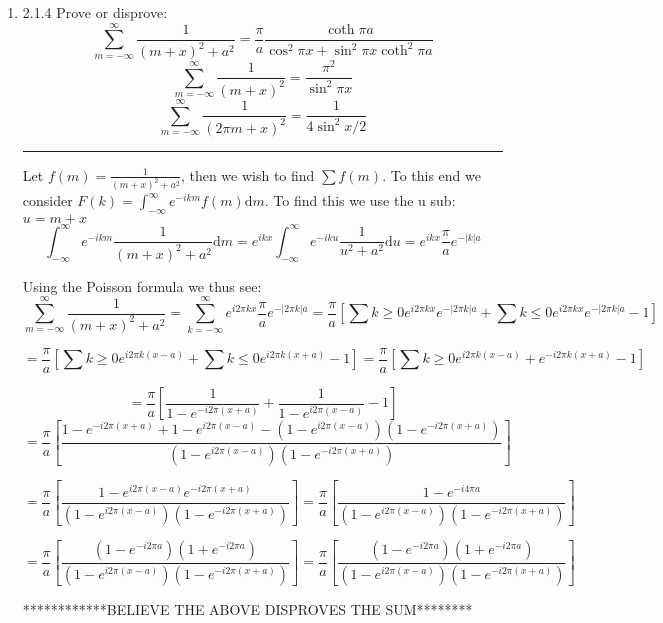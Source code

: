 \documentclass[12pt]{article}
\newcommand{\di}{\mathrm{d}}
\newcommand{\intinf}{\int_{-\infty}^\infty}
\newcommand{\suminf}[1]{\sum_{#1 = -\infty}^\infty}
\theoremstyle{definition}
\begin{document}
\begin{enumerate}
\item 2.1.4
Prove or disprove:
\[
\suminf{m} 
\frac 1 {(m+x)^2 + a^2} = \frac \pi a \frac {\coth \pi a } {\cos^2 \pi x + \sin^2 \pi x \coth^2 \pi a}
\]
\[
\suminf{m} 
\frac 1 {(m+x)^2} = \frac {\pi^2} { \sin^2 \pi x }
\]
\[
\suminf{m} 
\frac 1 {(2 \pi m+x)^2} = \frac {1} { 4 \sin^2 x/2 }
\]

\hrule

Let $f(m) = \frac 1 { (m+x)^2 +a^2} $, then we wish to find $\sum f(m)$. 
To this end we consider $F(k) = \intinf e^{-ikm} f(m) \di m$. To find this we use the u sub: $u = m+x$
\[
\intinf e^{-ikm} \frac 1 { (m+x)^2 +a^2}  \di m
=
e^{ikx} \intinf e^{-iku} \frac 1 { u^2 +a^2}  \di u
= 
e^{ikx} \frac \pi a e^{-|k| a}
\]


Using the Poisson formula we thus see:
\[
\suminf{m} 
\frac 1 {(m+x)^2 + a^2}  	
=
\suminf{k}
e^{i2\pi kx} \frac \pi a e^{-|2\pi k| a}
=
 \frac \pi a
 \left[
\sum{k\geq0}
e^{i 2 \pi kx}  e^{-| 2 \pi k| a}
+
\sum{k\leq0}
e^{i 2 \pi kx}  e^{-| 2 \pi k| a}
-1
\right]
\]

\[
=
 \frac \pi a
 \left[
\sum{k\geq0}
e^{i 2 \pi k(x-a)}
+
\sum{k\leq0}
e^{i 2 \pi k(x+a)}
-1
\right]
=
 \frac \pi a
 \left[
\sum{k\geq0}
e^{i 2 \pi k(x-a)}
+
e^{-i 2 \pi k(x+a)}
-1
\right]
\]

\[
=
 \frac \pi a
 \left[
\frac{ 1} { 1 -  e^{-i 2 \pi (x+a)} } +
\frac{ 1} { 1 -  e^{i 2 \pi (x-a)} }
-1
\right]
\]
\[
=
 \frac \pi a
 \left[
\frac{
1 -  e^{-i 2 \pi (x+a)}  
+1 -  e^{i 2 \pi (x-a)} 
-
\left(1 -  e^{i 2 \pi (x-a)} \right) 
\left(1 -  e^{-i 2 \pi (x+a)} \right) 
 	}
 { \left(1 -  e^{i 2 \pi (x-a)} \right) 
  \left(1 -  e^{-i 2 \pi (x+a)} \right) 
}
\right]
\]

\[
=
 \frac \pi a
 \left[
\frac{
1-
 e^{i 2 \pi (x-a)} 
e^{-i 2 \pi (x+a)} 
 	}
 { \left(1 -  e^{i 2 \pi (x-a)} \right) 
  \left(1 -  e^{-i 2 \pi (x+a)} \right) 
}
\right]
=
 \frac \pi a
 \left[
\frac{
1-
 e^{-i 4 \pi a} 
 	}
 { \left(1 -  e^{i 2 \pi (x-a)} \right) 
  \left(1 -  e^{-i 2 \pi (x+a)} \right) 
}
\right]
\]

\[
=
 \frac \pi a
 \left[
\frac{
	\left(1-e^{-i 2 \pi a}\right) 
	\left(1+e^{-i 2 \pi a}\right) 
 	}
 { \left(1 -  e^{i 2 \pi (x-a)} \right) 
  \left(1 -  e^{-i 2 \pi (x+a)} \right) 
}
\right]
=
 \frac \pi a
 \left[
\frac{
	\left(1-e^{-i 2 \pi a}\right) 
	\left(1+e^{-i 2 \pi a}\right) 
 	}
 { \left(1 -  e^{i 2 \pi (x-a)} \right) 
  \left(1 -  e^{-i 2 \pi (x+a)} \right) 
}
\right]
\]

************BELIEVE THE ABOVE DISPROVES THE SUM********\\


\end{enumerate}
\end{document}

